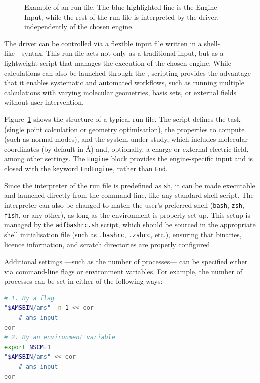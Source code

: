 \begin{figure}
  \centering
  \resizebox{\linewidth}{!}{}
  \caption{Example of an \ams run file. The blue highlighted line is the Engine
    Input, while the rest of the run file is interpreted by the \ams driver,
    independently of the chosen engine.}
  \label{ams_input}
\end{figure}

The \ams driver can be controlled via a flexible input file written in a
shell-like~\faTerminal~syntax. This run file acts not only as a traditional
input, but as a lightweight script that manages the execution of the chosen
engine. While calculations can also be launched through the \gui, scripting
provides the advantage that it enables systematic and automated workflows, such
as running multiple calculations with varying molecular geometries, basis sets,
or external fields without user intervention.

Figure~\ref{ams_input} shows the structure of a typical \ams run file. The
script defines the task (\eg single point calculation or geometry optimisation),
the properties to compute (such as normal modes), and the system under study,
which includes molecular coordinates (by default in \AA) and, optionally, a
charge or external electric field, among other settings. The \texttt{Engine}
block provides the engine-specific input and is closed with the keyword
\texttt{EndEngine}, rather than \texttt{End}.

Since the interpreter of the run file is predefined as \texttt{sh}, it can be
made executable and launched directly from the command line, like any standard
shell script. The interpreter can also be changed to match the user's preferred
shell (\eg \texttt{bash}, \texttt{zsh}, \texttt{fish}, or any other), as long
as the environment is properly set up. This setup is managed by the
\texttt{adfbashrc.sh} script, which should be sourced in the appropriate shell
initialisation file (such as \texttt{.bashrc}, \texttt{.zshrc}, etc.), ensuring
that binaries, licence information, and scratch directories are properly
configured.

Additional settings ---such as the number of processes--- can be specified
either via command-line flags or environment variables. For example, the number
of processes can be set in either of the following ways:

\newpage
\begin{lstlisting}[language=bash, numbers=none]
# 1. By a flag
"$AMSBIN/ams" -n 1 << eor
    # ams input
eor
# 2. By an environment variable
export NSCM=1
"$AMSBIN/ams" << eor
    # ams input
eor
\end{lstlisting}

